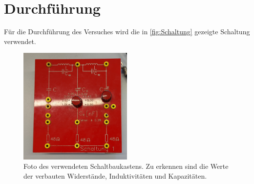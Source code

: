 \section{Durchführung}
\label{sec:Durchführung}
Für die Durchführung des Versuches wird die in \autoref{fig:Schaltung} gezeigte Schaltung verwendet. 
\begin{figure}
    \centering
    \caption{Foto des verwendeten Schaltbaukastens. Zu erkennen sind die Werte der verbauten Widerstände, Induktivitäten und Kapazitäten.}
    \label{fig:Schaltung}
    \includegraphics[width=0.5\textwidth]{content/Schaltung.jpg}
\end{figure}

